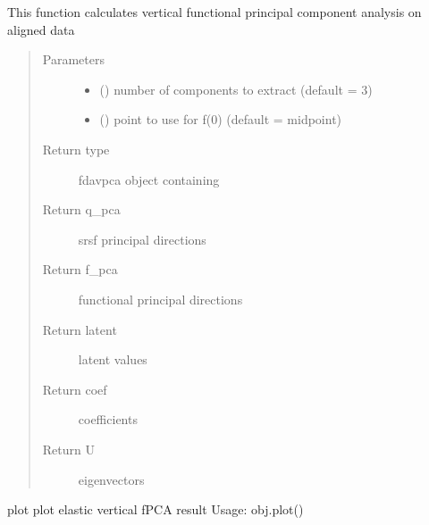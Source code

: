 \documentclass[letterpaper,10pt,english]{sphinxmanual}
\begin{document}
\begin{fulllineitems}
\begin{fulllineitems}
\label{\detokenize{fPCA:fPCA.fdavpca.calc_fpca}}
This function calculates vertical functional principal component analysis
on aligned data
\begin{quote}\begin{description}
\item[{Parameters}] \leavevmode\begin{itemize}
\item {} 
 () \textendash{} number of components to extract (default = 3)

\item {} 
 () \textendash{} point to use for f(0) (default = midpoint)

\end{itemize}

\item[{Return type}] \leavevmode
fdavpca object containing

\item[{Return q\_pca}] \leavevmode
srsf principal directions

\item[{Return f\_pca}] \leavevmode
functional principal directions

\item[{Return latent}] \leavevmode
latent values

\item[{Return coef}] \leavevmode
coefficients

\item[{Return U}] \leavevmode
eigenvectors

\end{description}\end{quote}

\end{fulllineitems}


\begin{fulllineitems}
\label{\detokenize{fPCA:fPCA.fdavpca.plot}}
plot plot elastic vertical fPCA result
Usage: obj.plot()

\end{fulllineitems}


\end{fulllineitems}
\end{document}
